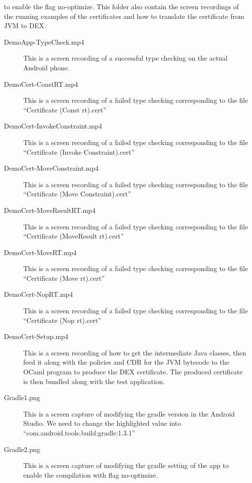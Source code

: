 \documentclass[a4]{article}
\begin{document}
\begin{description}
    to enable the flag no-optimize. This folder also contain the screen recordings of 
    the running examples of the certificates and how to translate the certificate 
    from JVM to DEX.  
    \begin{description}
      \item[DemoApp-TypeCheck.mp4] This is a screen recording of a successful type 
        checking on the actual Android phone.
      \item[DemoCert-ConstRT.mp4] This is a screen recording of a failed type checking
        corresponding to the file ``Certificate (Const rt).cert''
      \item[DemoCert-InvokeConstraint.mp4] This is a screen recording of a failed type  
        checking corresponding to the file ``Certificate (Invoke Constraint).cert''
      \item[DemoCert-MoveConstraint.mp4] This is a screen recording of a failed type 
        checking corresponding to the file ``Certificate (Move Constraint).cert''
      \item[DemoCert-MoveResultRT.mp4] This is a screen recording of a failed type 
        checking corresponding to the file ``Certificate (MoveResult rt).cert''
      \item[DemoCert-MoveRT.mp4] This is a screen recording of a failed type checking
        corresponding to the file ``Certificate (Move rt).cert''
      \item[DemoCert-NopRT.mp4] This is a screen recording of a failed type checking
        corresponding to the file ``Certificate (Nop rt).cert''
      \item[DemoCert-Setup.mp4] This is a screen recording of how to get the 
        intermediate Java classes, then feed it along with the policies and CDR for
        the JVM bytecode to the OCaml program to produce the DEX certificate. The 
        produced certificate is then bundled along with the test application.
      \item[Gradle1.png] This is a screen capture of modifying the gradle version in
        the Android Studio. We need to change the highlighted value into
        ``com.android.tools.build:gradle:1.3.1''
      \item[Gradle2.png] This is a screen capture of modifying the gradle setting of
        the app to enable the compilation with flag no-optimize.
    \end{description}
\end{description}
\end{document}
